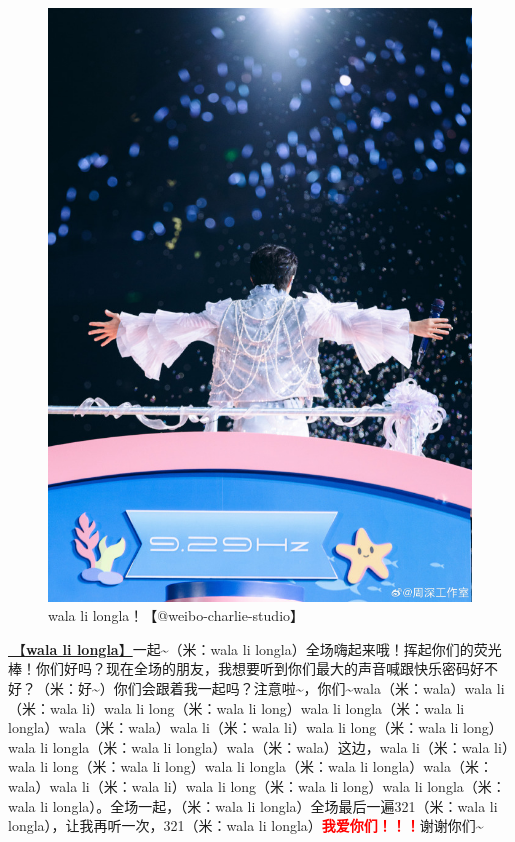 \documentclass[]{ctexbook}
\begin{document}
\begin{figure}

{\centering \includegraphics[width=400pt]{img/nanning20241207/005} 

}

\caption{wala li longla！【@weibo-charlie-studio】}\label{fig:unnamed-chunk-166}
\end{figure}

\hyperref[wala-li-longla]{🎵【\textbf{wala li longla}】}一起\textasciitilde（米：wala li longla）全场嗨起来哦！挥起你们的荧光棒！你们好吗？现在全场的朋友，我想要听到你们最大的声音喊跟快乐密码好不好？（米：好\textasciitilde）你们会跟着我一起吗？注意啦\textasciitilde，你们\textasciitilde wala（米：wala）wala li（米：wala li）wala li long（米：wala li long）wala li longla（米：wala li longla）wala（米：wala）wala li（米：wala li）wala li long（米：wala li long）wala li longla（米：wala li longla）wala（米：wala）这边，wala li（米：wala li）wala li long（米：wala li long）wala li longla（米：wala li longla）wala（米：wala）wala li（米：wala li）wala li long（米：wala li long）wala li longla（米：wala li longla）。全场一起，（米：wala li longla）全场最后一遍321（米：wala li longla），让我再听一次，321（米：wala li longla）\textbf{\textcolor{red}{我爱你们！！！}}谢谢你们\textasciitilde{}
\end{document}
